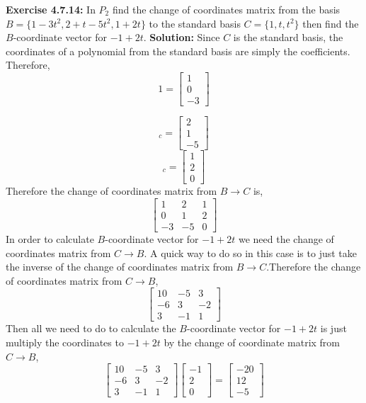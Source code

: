\documentclass{amsart}
\begin{document}
\vspace{1in}


\noindent\textbf{Exercise 4.7.14: } In $P_2$ find the change of coordinates matrix from the basis $B = \{1-3t^2,2+t-5t^2,1+2t\}$ to the standard basis $C = \{1,t,t^2\}$ then find the $B$-coordinate vector for $-1+2t$.
\noindent \textbf{Solution: } Since $C$ is the standard basis, the coordinates of a polynomial from the standard basis are simply the coefficients. Therefore,
\begin{equation*}
[b_1]1 = 
\begin{bmatrix}
1\\
0\\
-3
\end{bmatrix}
\end{equation*}

\begin{equation*}
[b_2]_c = 
\begin{bmatrix}
2\\
1\\
-5
\end{bmatrix}
\end{equation*}
\begin{equation*}
[b_3]_c = 
\begin{bmatrix}
1\\
2\\
0
\end{bmatrix}
\end{equation*}
Therefore the change of coordinates matrix from $B\to C$ is,
\begin{equation*}
\begin{bmatrix}
1&2&1\\
0&1&2\\
-3&-5&0
\end{bmatrix}
\end{equation*}
In order to calculate $B$-coordinate vector for $-1+2t$ we need the change of coordinates matrix from $C\to B$. A quick way to do so in this case is to just take the inverse of the change of coordinates matrix from $B\to C$.Therefore the change of coordinates matrix from $C\to B$,
\begin{equation*}
\begin{bmatrix}
10&-5&3\\
-6&3&-2\\
3&-1&1
\end{bmatrix}
\end{equation*}
Then all we need to do to calculate the  $B$-coordinate vector for $-1+2t$ is just multiply the coordinates to $-1+2t$ by the change of coordinate matrix from $C\to B$,
\begin{equation*}
\begin{bmatrix}
10&-5&3\\
-6&3&-2\\
3&-1&1
\end{bmatrix}
\begin{bmatrix}
-1\\
2\\
0
\end{bmatrix}
 = 
 \begin{bmatrix}
-20\\
12\\
-5
\end{bmatrix}
\end{equation*}
\vspace{1in}
\end{document}
